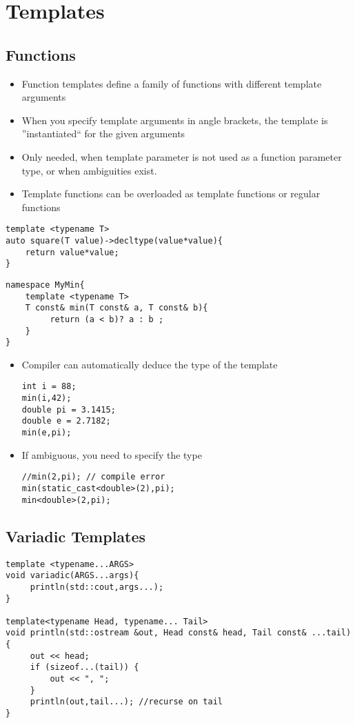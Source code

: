 \section{Templates}
\subsection{Functions}

\begin{itemize}
\item Function templates define a family of functions
with different template arguments
\item When you specify template arguments in angle
brackets, the template is ''instantiated`` for the
given arguments
\item Only needed, when template parameter is not
used as a function parameter type, or when
ambiguities exist.
\item Template functions can be overloaded as
template functions or regular functions
\end{itemize}

\begin{lstlisting}
template <typename T>
auto square(T value)->decltype(value*value){
	return value*value;
}
\end{lstlisting}
\begin{lstlisting}
namespace MyMin{
	template <typename T>
	T const& min(T const& a, T const& b){
		 return (a < b)? a : b ;
	}
}
\end{lstlisting}

\begin{itemize}
\item Compiler can automatically deduce the type of the template
\begin{lstlisting}
int i = 88;
min(i,42);
double pi = 3.1415;
double e = 2.7182;
min(e,pi);
\end{lstlisting}

\item If ambiguous, you need to specify the type
\begin{lstlisting}
//min(2,pi); // compile error
min(static_cast<double>(2),pi);
min<double>(2,pi);

\end{lstlisting}
\end{itemize}


\subsection{Variadic Templates}
\begin{lstlisting}
template <typename...ARGS>
void variadic(ARGS...args){
	 println(std::cout,args...);
}

template<typename Head, typename... Tail>
void println(std::ostream &out, Head const& head, Tail const& ...tail) {
	 out << head;
	 if (sizeof...(tail)) {
	 	 out << ", ";
	 }
	 println(out,tail...); //recurse on tail
}
\end{lstlisting}

